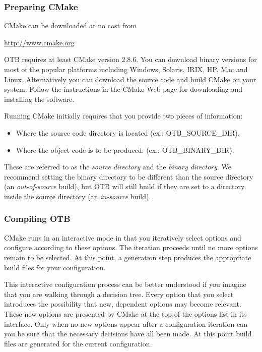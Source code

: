 \subsubsection{Preparing CMake}
\label{sec:CMakeforOTB}


CMake can be downloaded at no cost from
\begin{center}
  \url{http://www.cmake.org}
\end{center}

OTB requires at least CMake version 2.8.6. You can download binary versions for most of the popular platforms including Windows, Solaris, IRIX, HP, Mac and Linux. Alternatively you can download the source code and build CMake on your system. Follow the instructions in the CMake Web page for downloading and installing the software.

Running CMake initially requires that you provide two pieces of
information:
\begin{itemize}
\item Where the source code directory is located (ex.: OTB\_SOURCE\_DIR),
\item Where the object code is to be produced: (ex.: OTB\_BINARY\_DIR).
\end{itemize}
These are referred to as the \emph{source directory} and the \emph{binary directory}.
We recommend setting the binary directory to be different than the source directory (an
\emph{out-of-source} build), but OTB will still build if they are set
to a directory inside the source directory (an \emph{in-source} build).

\subsubsection{Compiling OTB}
CMake runs in an interactive mode in that you iteratively select
options and configure according to these options. The iteration
proceeds until no more options remain to be selected. At this point, a
generation step produces the appropriate build files for your
configuration.

This interactive configuration process can be better understood if you
imagine that you are walking through a decision tree.  Every option that you
select introduces the possibility that new, dependent options may become
relevant. These new options are presented by CMake at the top of the options
list in its interface.  Only when no new options appear after a configuration
iteration can you be sure that the necessary decisions have all been made. At
this point build files are generated for the current configuration.


